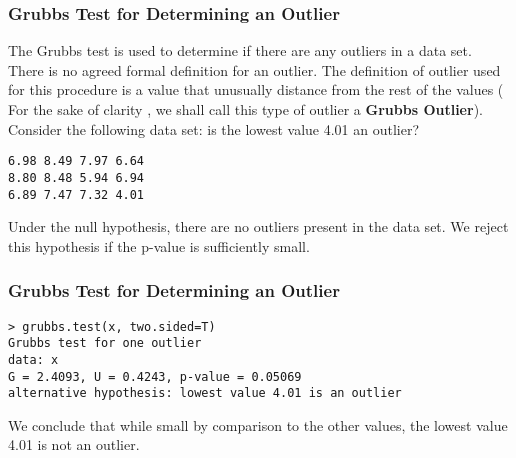 \documentclass[a4]{beamer}
\begin{document}
\begin{frame}[fragile]
\frametitle{Grubbs Test for Determining an Outlier}

The Grubbs test is used to determine if there are any outliers in a data set.\\ \bigskip
There is no agreed formal definition for an outlier. The definition of outlier used for this procedure is a value that unusually distance from the rest of the values ( For the sake of clarity , we shall call this type of outlier a \textbf{Grubbs Outlier}). Consider the following data set: is the lowest value 4.01 an outlier?
\begin{verbatim}
6.98 8.49 7.97 6.64
8.80 8.48 5.94 6.94
6.89 7.47 7.32 4.01
\end{verbatim}

Under the null hypothesis, there are no outliers present in the data set. 
We reject this hypothesis if the p-value is sufficiently small.
\end{frame}

\begin{frame}[fragile]
\frametitle{Grubbs Test for Determining an Outlier}
\begin{verbatim}
> grubbs.test(x, two.sided=T)
Grubbs test for one outlier
data: x
G = 2.4093, U = 0.4243, p-value = 0.05069
alternative hypothesis: lowest value 4.01 is an outlier
\end{verbatim}
We conclude that while small by comparison to the other values, the lowest value 4.01 is not an outlier.
\end{frame}
\end{document}
